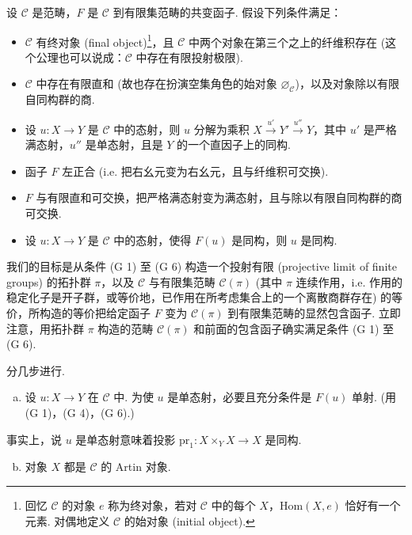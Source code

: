设 $\mathcal{C}$ 是范畴，$F$ 是 $\mathcal{C}$ 到有限集范畴的共变函子. 假设下列条件满足：
\begin{itemize}\tightlist
\item[(G 1)] $\mathcal{C}$ 有终对象 (final object)\footnote{回忆 $\mathcal{C}$ 的对象 $e$ 称为终对象，若对 $\mathcal{C}$ 中的每个 $X$，$\mathrm{Hom}(X, e)$ 恰好有一个元素. 对偶地定义 $\mathcal{C}$ 的始对象 (initial object).}，且 $\mathcal{C}$ 中两个对象在第三个之上的纤维积存在 (这个公理也可以说成：$\mathcal{C}$ 中存在有限投射极限).
\item[(G 2)] $\mathcal{C}$ 中存在有限直和 (故也存在扮演空集角色的始对象 $\varnothing_{\mathcal{C}}$)，以及对象除以有限自同构群的商.
\item[(G 3)] 设 $u \colon X \to Y$ 是 $\mathcal{C}$ 中的态射，则 $u$ 分解为乘积 $X \xrightarrow{u'} Y' \xrightarrow{u''} Y$，其中 $u'$ 是严格满态射，$u''$ 是单态射，且是 $Y$ 的一个直因子上的同构.
\item[(G 4)] 函子 $F$ 左正合 (i.e. 把右幺元变为右幺元，且与纤维积可交换).
\item[(G 5)] $F$ 与有限直和可交换，把严格满态射变为满态射，且与除以有限自同构群的商可交换.
\item[(G 6)] 设 $u \colon X \to Y$ 是 $\mathcal{C}$ 中的态射，使得 $F(u)$ 是同构，则 $u$ 是同构.
\end{itemize}

我们的目标是从条件 (G 1) 至 (G 6) 构造一个投射有限 (projective limit of finite groups) 的拓扑群 $\pi$，以及 $\mathcal{C}$ 与有限集范畴 $\mathcal{C}(\pi)$ (其中 $\pi$ 连续作用，i.e. 作用的稳定化子是开子群，或等价地，已作用在所考虑集合上的一个离散商群存在) 的等价，所构造的等价把给定函子 $F$ 变为 $\mathcal{C}(\pi)$ 到有限集范畴的显然包含函子. 立即注意，用拓扑群 $\pi$ 构造的范畴 $\mathcal{C}(\pi)$ 和前面的包含函子确实满足条件 (G 1) 至 (G 6).

分几步进行.

\begin{enumerate}[a)]
\item 设 $u \colon X \to Y$ 在 $\mathcal{C}$ 中. 为使 $u$ 是单态射，必要且充分条件是 $F(u)$ 单射. (用 (G 1)，(G 4)，(G 6).)
\end{enumerate}

事实上，说 $u$ 是单态射意味着投影 $\mathrm{pr}_1 \colon X \times_Y X \to X$ 是同构.

\begin{enumerate}[a)]
\setcounter{enumi}{1}
\item 对象 $X$ 都是 $\mathcal{C}$ 的 Artin 对象.
\end{enumerate}

